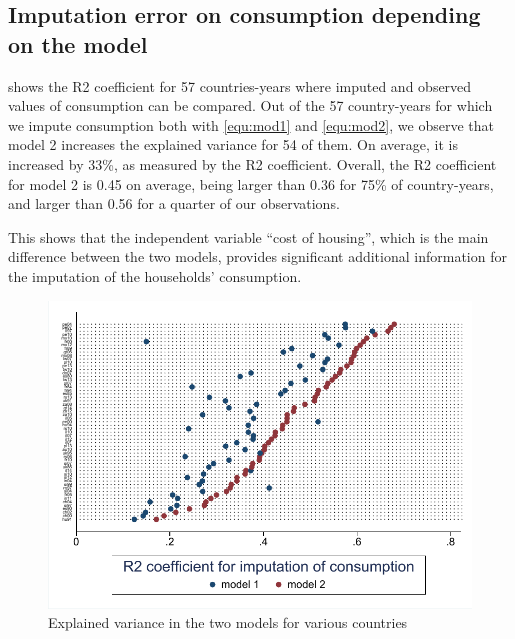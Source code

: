 \subsection{Imputation error on consumption depending on the model}
\label{sec:compare_models}
 shows the R2 coefficient for 57 countries-years where imputed and observed values of consumption can be compared. Out of the 57 country-years for which we impute consumption both with \eqref{equ:mod1} and \eqref{equ:mod2}, we observe that model 2 increases the explained variance for 54 of them. On average, it is increased by 33\%, as measured by the R2 coefficient. Overall, the R2 coefficient for model 2 is 0.45 on average, being larger than 0.36 for 75\% of country-years, and larger than 0.56 for a quarter of our observations.

This shows that the independent variable ``cost of housing'', which is the main difference between the two models, provides significant additional information for the imputation of the households' consumption.

\begin{figure}[!h]
\centering
\includegraphics[width=\textwidth]{"images/19-04-05 R2 compare models"}
\caption{Explained variance in the two models for various countries}
\label{fig:compare_models}  
\end{figure}


